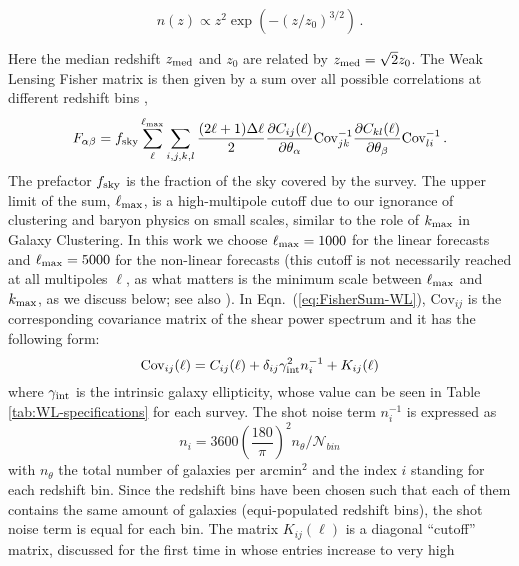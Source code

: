 \begin{equation}
n(z)\propto z^{2}\exp\left(-(z/z_{0})^{3/2}\right) \, . \label{eq:ngal dist}
\end{equation}

Here the median redshift $z_{\rm med}$ and $z_{0}$ are related by $z_{\rm med}=\sqrt{2}z_{0}$.
The Weak Lensing Fisher matrix is then 
given by a sum over all possible correlations at different redshift bins
\citep{tegmark_measuring_1998},
\begin{equation}
F_{\alpha\beta}=f_{\rm sky}\sum_{\ell}^{\ell_{\mathrm{max}}}\sum_{i,j,k,l}\frac{(2\ell+1)\Delta\ell}{2}\frac{\partial
C_{ij}(\ell)}{\partial\theta_{\alpha}}\textrm{Cov}_{jk}^{-1}\frac{\partial
C_{kl}(\ell)}{\partial\theta_{\beta}}\textrm{Cov}_{li}^{-1} \, . \label{eq:FisherSum-WL}
\end{equation}
The prefactor $f_{\rm sky}$ is the fraction of the sky covered by the survey. The upper limit of the sum, $\ell_{\mathrm{max}}$, is a high-multipole cutoff due to our ignorance of clustering and baryon physics on small
scales, similar to the role of $k_{\rm max}$ in Galaxy Clustering. In this work we choose $\ell_{\mathrm{max}} = 1000$ for the linear forecasts and $\ell_{\mathrm{max}} = 5000$ for the
non-linear forecasts (this cutoff is not necessarily reached at all multipoles $\ell$, as what matters is the minimum scale between $\ell_{\rm max}$ and $k_{\rm max}$, as we discuss below; see also \cite{casas_fitting_2015}).
In Eqn.\ (\ref{eq:FisherSum-WL}), $\textrm{Cov}_{ij}$ is the corresponding covariance matrix of the shear power spectrum and it has the following form:
\begin{equation}
\textrm{Cov}_{ij}(\ell)=C_{ij}(\ell)+\delta_{ij}\gamma_{\rm int}^{2}n_{i}^{-1}+K_{ij}(\ell)
\end{equation}
where $\gamma_{\rm int}$ is the intrinsic galaxy ellipticity, whose value can be seen in Table \ref{tab:WL-specifications} for each survey. The
shot noise term $n_{i}^{-1}$ is expressed as
\begin{equation}
n_{i}=3600\left(\frac{180}{\pi}\right)^{2}n_{\theta}/\mathcal{N}_{bin}
\end{equation}
with $n_{\theta}$ the total number of galaxies per $\text{arcmin}^2$ and the index $i$ standing for each redshift bin.
Since the redshift bins have been chosen such that each of them contains
the same amount of galaxies (equi-populated redshift bins), the shot noise term is equal for each bin.
The matrix $K_{ij}(\ell)$
is a diagonal ``cutoff'' matrix, discussed for the first time in \cite{casas_fitting_2015} whose entries increase to very high
